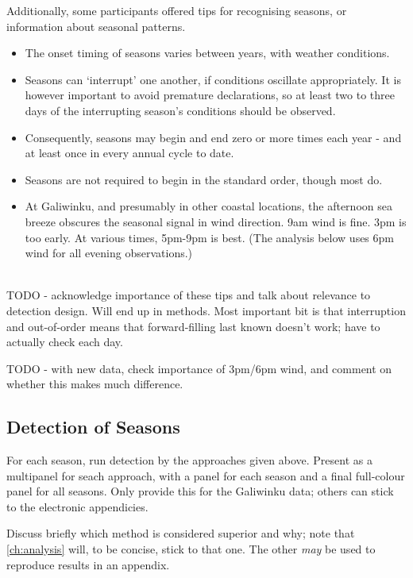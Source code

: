 Additionally, some participants offered tips for recognising seasons,
or information about seasonal patterns.

\begin{itemize}
\item The onset timing of seasons varies between years, with weather conditions. 

\item Seasons can `interrupt' one another, if conditions oscillate appropriately.
        It is however important to avoid premature declarations, so at least two to
        three days of the interrupting season's conditions should be observed.

\item Consequently, seasons may begin and end zero or more times each year -
        and at least once in every annual cycle to date.

\item Seasons are not required to begin in the standard order, though most do.

\item At Galiwinku, and presumably in other coastal locations, the afternoon
        sea breeze obscures the seasonal signal in wind direction.
        9am wind is fine.  3pm is too early.  At various times, 5pm-9pm is best.
        (The analysis below uses 6pm wind for all evening observations.)
\end{itemize}

~\\

TODO - acknowledge importance of these tips and talk about relevance to
detection design.  Will end up in methods.  Most important bit is that
interruption and out-of-order means that forward-filling last known
doesn't work; have to actually check each day.

TODO - with new data, check importance of 3pm/6pm wind, and comment on
whether this makes much difference.




\subsection{Detection of Seasons}
For each season, run detection by the approaches given above.
Present as a multipanel for seach approach, with a panel for each season
and a final full-colour panel for all seasons.  Only provide this for the
Galiwinku data; others can stick to the electronic appendicies.

Discuss briefly which method is considered superior and why; note
that \autoref{ch:analysis} will, to be concise, stick to that one.
The other \emph{may} be used to reproduce results in an appendix.

